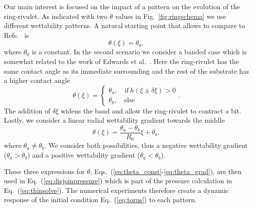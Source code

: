\documentclass[twoside,twocolumn,9pt]{article}
\begin{document}
Our main interest is focused on the impact of a pattern on the evolution of the ring-rivulet. 
As indicated with two $\theta$ values in Fig.~\ref{fig:ringschema} we use different wettability patterns.
A natural starting point that allows to compare to Refs.~\cite{gonzalezStabilityLiquidRing2013, nguyenCompetitionCollapseBreakup2012, wuBreakupPatternedNanoscale2010} is
\begin{equation}\label{eq:theta_const}
    \theta(\xi) = \theta_0,
\end{equation}
where $\theta_0$ is a constant.
In the second scenario we consider a banded case which is somewhat related to the work of Edwards et al.~\cite{edwardsControllingBreakupToroidal2021}. 
Here the ring-rivulet has the same contact angle as its immediate surrounding and the rest of the substrate has a higher contact angle
\begin{equation}\label{eq:theta_band}
    \theta(\xi) =\begin{cases}
        \theta_a,\quad \text{if}~h(\xi\pm \delta\xi) > 0\\
        \theta_b,\quad \text{else}
    \end{cases}.
\end{equation}
The addition of $\delta\xi$ widens the band and allow the ring-rivulet to contract a bit.  
Lastly, we consider a linear radial wettability gradient towards the middle
\begin{equation}\label{eq:theta_grad}
    \theta(\xi) = \frac{\theta_{a}-\theta_{b}}{R_0} \xi + \theta_{b},
\end{equation}
where $\theta_{a}\neq\theta_{b}$.
We consider both possibilities, thus a negative wettability gradient ($\theta_a > \theta_b$) and a positive wettability gradient ($\theta_a < \theta_b$).

These three expressions for $\theta$, Eqs.~(\ref{eq:theta_const}-\ref{eq:theta_grad}), are then used in Eq.~(\ref{eq:disjoinpressure}) which is part of the pressure calculation in Eq.~(\ref{eq:thinsolve}).
The numerical experiments therefore create a dynamic response of the initial condition Eq.~(\ref{eq:torus}) to each pattern.
\end{document}
